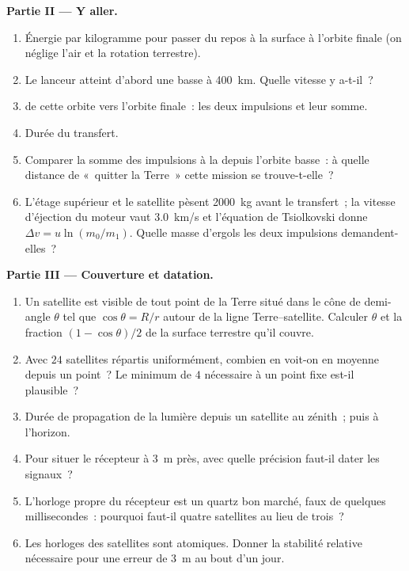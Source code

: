 \begin{problem}
\medskip
\noindent\textbf{Partie II --- Y aller.}
\begin{enumerate}[resume]
  \item Énergie par kilogramme pour passer du repos à la surface à
        l'orbite finale (on néglige l'air et la rotation terrestre).
  \item Le lanceur atteint d'abord une  basse à
        \qty{400}{km}. Quelle vitesse y a-t-il~?
  \item {} de cette orbite vers l'orbite finale~: les
        deux impulsions et leur somme.
  \item Durée du transfert.
  \item Comparer la somme des impulsions à la 
        depuis l'orbite basse~: à quelle distance de «~quitter la Terre~»
        cette mission se trouve-t-elle~?
  \item L'étage supérieur et le satellite pèsent \qty{2000}{kg} avant le
        transfert~; la vitesse d'éjection du moteur vaut \qty{3.0}{km/s}
        et l'équation de Tsiolkovski donne $\Delta v = u\ln(m_0/m_1)$.
        Quelle masse d'ergols les deux impulsions demandent-elles~?
\end{enumerate}

\medskip
\noindent\textbf{Partie III --- Couverture et datation.}
\begin{enumerate}[resume]
  \item Un satellite est visible de tout point de la Terre situé dans le
        cône de demi-angle $\theta$ tel que $\cos\theta = R/r$ autour de
        la ligne Terre--satellite. Calculer $\theta$ et la fraction
        $(1 - \cos\theta)/2$ de la surface terrestre qu'il couvre.
  \item Avec $24$ satellites répartis uniformément, combien en voit-on en
        moyenne depuis un point~? Le minimum de $4$ nécessaire à un point
        fixe est-il plausible~?
  \item Durée de propagation de la lumière depuis un satellite au
        zénith~; puis à l'horizon.
  \item Pour situer le récepteur à \qty{3}{m} près, avec quelle précision
        faut-il dater les signaux~?
  \item L'horloge propre du récepteur est un quartz bon marché, faux de
        quelques millisecondes~: pourquoi faut-il quatre satellites au
        lieu de trois~?
  \item Les horloges des satellites sont atomiques. Donner la stabilité
        relative nécessaire pour une erreur de \qty{3}{m} au bout d'un jour.
\end{enumerate}


\end{problem}
